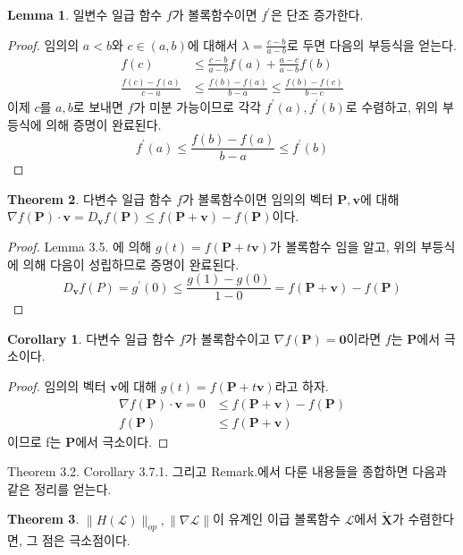 \documentclass[a4paper,20pt]{article}
\theoremstyle{definition}
\newtheorem{theorem}{Theorem}[section]
\newtheorem{corollary}{Corollary}[theorem]
\newtheorem{lemma}[theorem]{Lemma}
\newcommand{\curve}[1][X]{\tilde{\mathbf{#1}}}
\begin{document}
\begin{lemma}
일변수 일급 함수 $f$가 볼록함수이면 $f^{\prime}$은 단조 증가한다.
\end{lemma}
\begin{proof}
임의의 $a<b$와 $c \in (a,b)$에 대해서 $\lambda=\frac{c-b}{a-b}$로 두면 다음의 부등식을 얻는다.
\begin{align*}
f(c)&\leq\frac{c-b}{a-b}f(a)+\frac{a-c}{a-b}f(b) \\
\frac{f(c)-f(a)}{c-a}&\leq\frac{f(b)-f(a)}{b-a}\leq\frac{f(b)-f(c)}{b-c}
\end{align*}
이제 $c$를 $a,b$로 보내면 $f$가 미분 가능이므로 각각 $f^{\prime}(a),f^{\prime}(b)$로 수렴하고, 위의 부등식에 의해 증명이 완료된다.
$$f^{\prime}(a)\leq\frac{f(b)-f(a)}{b-a}\leq f^{\prime}(b)$$
\end{proof}

\newpage
\begin{theorem}
다변수 일급 함수 $f$가 볼록함수이면 임의의 벡터 $\mathbf{P},\mathbf{v}$에 대해 $\nabla f(\mathbf{P})\cdot \mathbf{v}=D_{\mathbf{v}}f(\mathbf{P})\leq f(\mathbf{P}+\mathbf{v})-f(\mathbf{P})$이다.
\end{theorem}
\begin{proof}
Lemma 3.5. 에 의해 $g(t)=f(\mathbf{P}+t\mathbf{v})$가 볼록함수 임을 알고, 위의 부등식에 의해 다음이 성립하므로 증명이 완료된다.
$$
D_{\mathbf{v}}f(P)=g^{\prime}(0)\leq\frac{g(1)-g(0)}{1-0}=f(\mathbf{P}+\mathbf{v})-f(\mathbf{P})
$$
\end{proof}

\begin{corollary}
다변수 일급 함수 $f$가 볼록함수이고 $\nabla f(\mathbf{P})=\mathbf{0}$이라면 $f$는 $\mathbf{P}$에서 극소이다.
\end{corollary}
\begin{proof}
임의의 벡터 $\mathbf{v}$에 대해 $g(t)=f(\mathbf{P}+t\mathbf{v})$라고 하자. 
\begin{align*}
\nabla f(\mathbf{P})\cdot\mathbf{v}=0&\leq f(\mathbf{P}+\mathbf{v})-f(\mathbf{P}) \\ f(\mathbf{P})&\leq f(\mathbf{P}+\mathbf{v})
\end{align*}
이므로 f는 $\mathbf{P}$에서 극소이다.
\end{proof}


Theorem 3.2. Corollary 3.7.1. 그리고 Remark.에서 다룬 내용들을 종합하면 다음과 같은 정리를 얻는다.
\begin{theorem}
$\|H(\mathcal{L})\|_{op}, \|\nabla\mathcal{L}\|$이 유계인 이급 볼록함수 $\mathcal{L}$에서 $\curve$가 수렴한다면, 그 점은 극소점이다.
\end{theorem}
\end{document}
